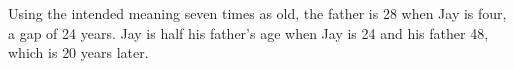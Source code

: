 Using the intended meaning seven times as old, the father is 28 when Jay is four, a gap of 24 years. Jay is half his father's age when Jay is 24 and his father 48, which is $\boxed{20}$ years later.
